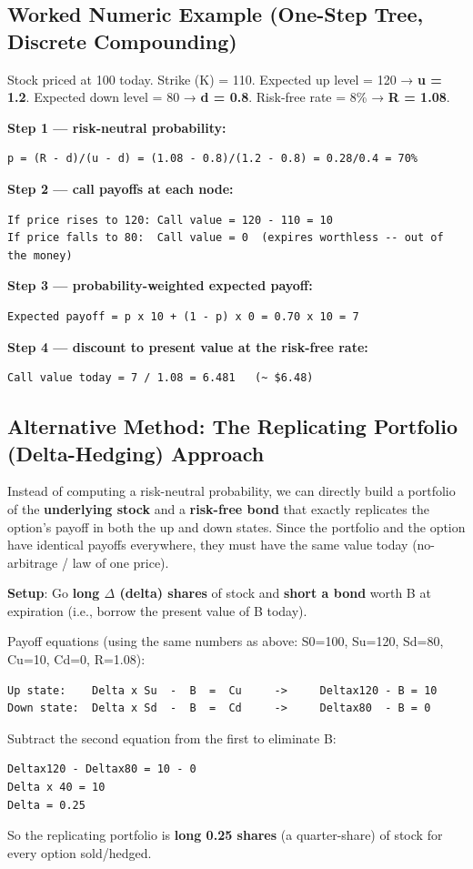 \documentclass[12pt,openany]{book}
\theoremstyle{definition}
\theoremstyle{remark}
\begin{document}
\subsection{Worked Numeric Example (One-Step Tree, Discrete Compounding)}

Stock priced at 100 today. Strike (K) = 110. Expected up level = 120 → \textbf{u = 1.2}. Expected down level = 80 → \textbf{d = 0.8}. Risk-free rate = 8\% → \textbf{R = 1.08}.

\textbf{Step 1 — risk-neutral probability:}
\begin{lstlisting}[style=notesCode]
p = (R - d)/(u - d) = (1.08 - 0.8)/(1.2 - 0.8) = 0.28/0.4 = 70%
\end{lstlisting}

\textbf{Step 2 — call payoffs at each node:}
\begin{lstlisting}[style=notesCode]
If price rises to 120: Call value = 120 - 110 = 10
If price falls to 80:  Call value = 0  (expires worthless -- out of the money)
\end{lstlisting}

\textbf{Step 3 — probability-weighted expected payoff:}
\begin{lstlisting}[style=notesCode]
Expected payoff = p x 10 + (1 - p) x 0 = 0.70 x 10 = 7
\end{lstlisting}

\textbf{Step 4 — discount to present value at the risk-free rate:}
\begin{lstlisting}[style=notesCode]
Call value today = 7 / 1.08 = 6.481   (~ $6.48)
\end{lstlisting}

\subsection{Alternative Method: The Replicating Portfolio (Delta-Hedging) Approach}

Instead of computing a risk-neutral probability, we can directly build a portfolio of the \textbf{underlying stock} and a \textbf{risk-free bond} that exactly replicates the option's payoff in both the up and down states. Since the portfolio and the option have identical payoffs everywhere, they must have the same value today (no-arbitrage / law of one price).

\textbf{Setup}: Go \textbf{long \ensuremath{\Delta} (delta) shares} of stock and \textbf{short a bond} worth B at expiration (i.e., borrow the present value of B today).

Payoff equations (using the same numbers as above: S0=100, Su=120, Sd=80, Cu=10, Cd=0, R=1.08):
\begin{lstlisting}[style=notesCode]
Up state:    Delta x Su  -  B  =  Cu     ->     Deltax120 - B = 10
Down state:  Delta x Sd  -  B  =  Cd     ->     Deltax80  - B = 0
\end{lstlisting}
Subtract the second equation from the first to eliminate B:
\begin{lstlisting}[style=notesCode]
Deltax120 - Deltax80 = 10 - 0
Delta x 40 = 10
Delta = 0.25
\end{lstlisting}
So the replicating portfolio is \textbf{long 0.25 shares} (a quarter-share) of stock for every option sold/hedged.
\end{document}
